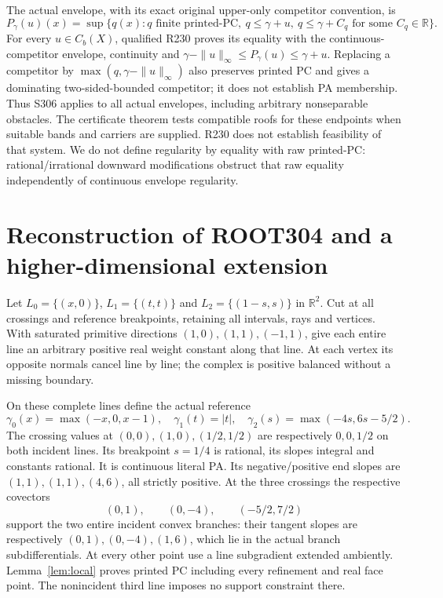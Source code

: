 \documentclass[11pt]{article}
\newcommand{\R}{\mathbb R}
\begin{document}
The actual envelope, with its exact original upper-only competitor convention, is
\[
 P_\gamma(u)(x)=\sup\{q(x):q\text{ finite printed-PC},\ q\leq\gamma+u,
 \ q\leq\gamma+C_q\text{ for some }C_q\in\R\}.                     \tag{5.3}
\]
For every $u\in C_b(X)$, qualified R230 proves its equality with the continuous-competitor envelope, continuity and
$\gamma-\|u\|_\infty\leq P_\gamma(u)\leq\gamma+u$. Replacing a competitor by $\max(q,\gamma-\|u\|_\infty)$ also preserves printed PC and gives a dominating two-sided-bounded competitor; it does not establish PA membership. Thus S306 applies to all actual envelopes, including arbitrary nonseparable obstacles. The certificate theorem tests compatible roofs for these endpoints when suitable bands and carriers are supplied. R230 does not establish feasibility of that system. We do not define regularity by equality with raw printed-PC: rational/irrational downward modifications obstruct that raw equality independently of continuous envelope regularity.

\section{Reconstruction of ROOT304 and a higher-dimensional extension}
Let $L_0=\{(x,0)\}$, $L_1=\{(t,t)\}$ and $L_2=\{(1-s,s)\}$ in $\R^2$. Cut at all crossings and reference breakpoints, retaining all intervals, rays and vertices. With saturated primitive directions $(1,0),(1,1),(-1,1)$, give each entire line an arbitrary positive real weight constant along that line. At each vertex its opposite normals cancel line by line; the complex is positive balanced without a missing boundary.

On these complete lines define the actual reference
\[
 \gamma_0(x)=\max(-x,0,x-1),\quad
 \gamma_1(t)=|t|,\quad
 \gamma_2(s)=\max(-4s,6s-5/2).                                      \tag{6.1}
\]
The crossing values at $(0,0),(1,0),(1/2,1/2)$ are respectively $0,0,1/2$ on both incident lines. Its breakpoint $s=1/4$ is rational, its slopes integral and constants rational. It is continuous literal PA. Its negative/positive end slopes are $(1,1),(1,1),(4,6)$, all strictly positive. At the three crossings the respective covectors
\[
 (0,1),\qquad (0,-4),\qquad (-5/2,7/2)
\]
support the two entire incident convex branches: their tangent slopes are respectively $(0,1),(0,-4),(1,6)$, which lie in the actual branch subdifferentials. At every other point use a line subgradient extended ambiently. Lemma~\ref{lem:local} proves printed PC including every refinement and real face point. The nonincident third line imposes no support constraint there.
\end{document}
